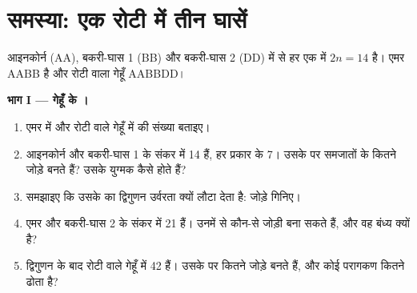 \section{समस्या: एक रोटी में तीन घासें}

\begin{problem}
\label{pb:g12:diversification-of-life:1}
आइनकोर्न (AA), बकरी-घास 1 (BB) और बकरी-घास 2 (DD) में से हर एक में
$2n = 14$ है। एमर AABB है और रोटी वाला गेहूँ AABBDD।

\medskip
\noindent\textbf{भाग I --- गेहूँ के ।}
\begin{enumerate}
  \item एमर में और रोटी वाले गेहूँ में  की संख्या बताइए।
  \item आइनकोर्न और बकरी-घास 1 के संकर में 14  हैं, हर प्रकार के
        7। उसके  पर समजातों के कितने जोड़े बनते हैं?
        उसके युग्मक कैसे होते हैं?
  \item समझाइए कि उसके  का द्विगुणन उर्वरता क्यों लौटा देता है:
        जोड़े गिनिए।
  \item एमर और बकरी-घास 2 के संकर में 21  हैं। उनमें से कौन-से
        जोड़ी बना सकते हैं, और वह बंध्य क्यों है?
  \item द्विगुणन के बाद रोटी वाले गेहूँ में 42 हैं। उसके 
        पर कितने जोड़े बनते हैं, और कोई परागकण कितने  ढोता है?
\end{enumerate}


\end{problem}
